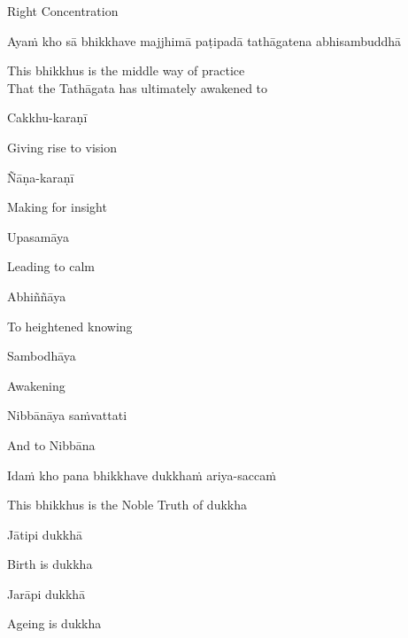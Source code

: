 \begin{cprenglish}
Right Concentration
\end{cprenglish}

Ayaṁ kho sā bhikkhave majjhimā paṭipadā tathāgatena abhisambuddhā

\begin{cprenglish}
This bhikkhus is the middle way of practice\\
That the Tathāgata has ultimately awakened to
\end{cprenglish}

Cakkhu-karaṇī

\begin{cprenglish}
Giving rise to vision
\end{cprenglish}

Ñāṇa-karaṇī

\begin{cprenglish}
Making for insight
\end{cprenglish}

Upasamāya

\begin{cprenglish}
Leading to calm
\end{cprenglish}

Abhiññāya

\begin{cprenglish}
To heightened knowing
\end{cprenglish}

Sambodhāya

\begin{cprenglish}
Awakening
\end{cprenglish}

Nibbānāya saṁvattati

\begin{cprenglish}
And to Nibbāna
\end{cprenglish}

Idaṁ kho pana bhikkhave dukkhaṁ ariya-saccaṁ

\begin{cprenglish}
This bhikkhus is the Noble Truth of dukkha
\end{cprenglish}

Jātipi dukkhā

\begin{cprenglish}
Birth is dukkha
\end{cprenglish}

Jarāpi dukkhā

\begin{cprenglish}
Ageing is dukkha
\end{cprenglish}

